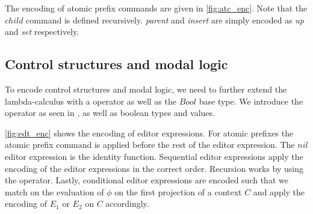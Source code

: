 \documentclass[sigplan,anonymous,review]{acmart}
\begin{document}
The encoding of atomic prefix commands are given in
\cref{fig:atc_enc}. Note that the $child$ command is defined
recursively. \textit{parent} and \textit{insert} are simply encoded as \textit{up} and \textit{set} respectively.

\subsection{Control structures and modal logic}

To encode control structures and modal logic, we need to further
extend the lambda-calculus with a \fix operator as well as the $Bool$
base type. We introduce the \fix operator as seen in
\cite{types_programming_languages}, as well as boolean types and
values.

\cref{fig:edt_enc} shows the encoding of editor expressions. For
atomic prefixes the atomic prefix command is applied before the
rest of the editor expression. The $nil$ editor expression is
the identity function. Sequential editor expressions apply the
encoding of the editor expressions in the correct order. Recursion
works by using the \fix operator. Lastly, conditional
editor expressions are encoded such that we match on the evaluation of
$\phi$ on the first projection of a context $C$ and apply the encoding
of $E_1$ or $E_2$ on $C$ accordingly. 
\end{document}
